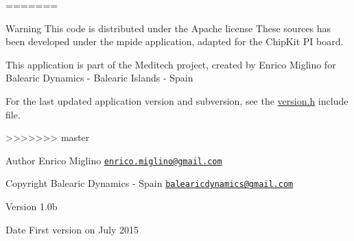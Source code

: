 =======
\begin{DoxyWarning}{Warning}
This code is distributed under the Apache license These sources has been developed under the mpide application, adapted for the Chip\-Kit P\-I board.\par
This application is part of the Meditech project, created by Enrico Miglino for Balearic Dynamics -\/ Balearic Islands -\/ Spain\par
For the last updated application version and subversion, see the \hyperlink{_version_8h}{version.\-h} include file.
\end{DoxyWarning}
>>>>>>> master
\begin{DoxyAuthor}{Author}
Enrico Miglino \href{mailto:enrico.miglino@gmail.com}{\tt enrico.\-miglino@gmail.\-com} 
\end{DoxyAuthor}
\begin{DoxyCopyright}{Copyright}
Balearic Dynamics -\/ Spain \href{mailto:balearicdynamics@gmail.com}{\tt balearicdynamics@gmail.\-com} 
\end{DoxyCopyright}
\begin{DoxyVersion}{Version}
1.\-0b 
\end{DoxyVersion}
\begin{DoxyDate}{Date}
First version on July 2015 
\end{DoxyDate}
